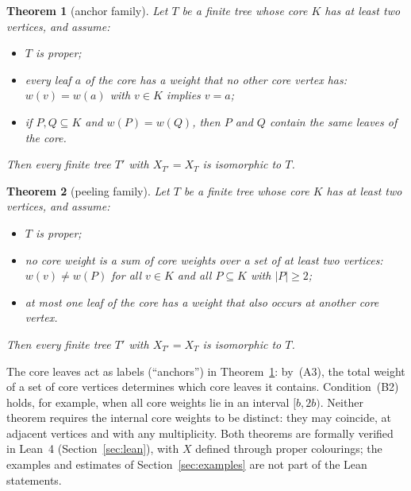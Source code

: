 \documentclass[11pt]{article}
\newtheorem{theorem}{Theorem}
\theoremstyle{definition}
\theoremstyle{remark}
\begin{document}
\begin{theorem}[anchor family]\label{thm:A}
Let $T$ be a finite tree whose core $K$ has at least two vertices, and assume:
\begin{itemize}
\item[(A1)] $T$ is proper;
\item[(A2)] every leaf $a$ of the core has a weight that no other core vertex
has: $w(v)=w(a)$ with $v\in K$ implies $v=a$;
\item[(A3)] if $P,Q\subseteq K$ and $w(P)=w(Q)$, then $P$ and $Q$ contain the
same leaves of the core.
\end{itemize}
Then every finite tree $T'$ with $X_{T'}=X_T$ is isomorphic to $T$.
\end{theorem}

\begin{theorem}[peeling family]\label{thm:B}
Let $T$ be a finite tree whose core $K$ has at least two vertices, and assume:
\begin{itemize}
\item[(B1)] $T$ is proper;
\item[(B2)] no core weight is a sum of core weights over a set of at least two
vertices: $w(v)\ne w(P)$ for all $v\in K$ and all $P\subseteq K$ with
$|P|\ge2$;
\item[(B3)] at most one leaf of the core has a weight that also occurs at
another core vertex.
\end{itemize}
Then every finite tree $T'$ with $X_{T'}=X_T$ is isomorphic to $T$.
\end{theorem}

\noindent The core leaves act as labels (``anchors'') in Theorem~\ref{thm:A}:
by~(A3), the total weight of a set of core vertices determines which core leaves
it contains. Condition~(B2) holds, for example, when all core weights lie in an
interval $[b,2b)$. Neither theorem requires the internal core weights to be
distinct: they may coincide, at adjacent vertices and with any multiplicity. Both theorems are
formally verified in Lean~4 (Section~\ref{sec:lean}), with $X$ defined through
proper colourings; the examples and estimates of Section~\ref{sec:examples} are
not part of the Lean statements.
\end{document}
